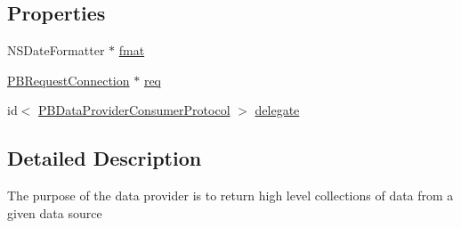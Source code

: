 \subsection*{Properties}
\begin{DoxyCompactItemize}
\item 
NSDateFormatter $\ast$ \hyperlink{interface_p_b_data_provider_a148f8968959e9479440e1603022bc162}{fmat}
\item 
\hyperlink{interface_p_b_request_connection}{PBRequestConnection} $\ast$ \hyperlink{interface_p_b_data_provider_aeb946996c2b8bff6715ae772cd39fe48}{req}
\item 
id$<$ \hyperlink{protocol_p_b_data_provider_consumer_protocol-p}{PBDataProviderConsumerProtocol} $>$ \hyperlink{interface_p_b_data_provider_a68117050d352cc1b3a3ad6267d45ed39}{delegate}
\end{DoxyCompactItemize}


\subsection{Detailed Description}
The purpose of the data provider is to return high level collections of data from a given data source 

